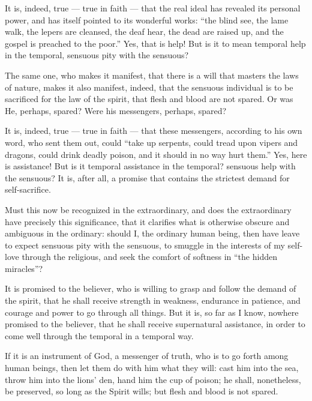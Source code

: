 \documentclass[12pt,a4paper]{book}
\begin{document}
It is, indeed, true --- true in faith --- that the real ideal has revealed its personal power, and has itself pointed to its wonderful works: ``the blind see, the lame walk, the lepers are cleansed, the deaf hear, the dead are raised up, and the gospel is preached to the poor.'' Yes, that is help! But is it to mean temporal help in the temporal, sensuous pity with the sensuous?

The same one, who makes it manifest, that there is a will that masters the laws of nature, makes it also manifest, indeed, that the sensuous individual is to be sacrificed for the law of the spirit, that flesh and blood are not spared. Or was He, perhaps, spared? Were his messengers, perhaps, spared?

It is, indeed, true --- true in faith --- that these messengers, according to his own word, who sent them out, could ``take up serpents, could tread upon vipers and dragons, could drink deadly poison, and it should in no way hurt them.''
Yes, here is assistance! But is it temporal assistance in the temporal? sensuous help with the sensuous? It is, after all, a promise that contains the strictest demand for self-sacrifice.

Must this now be recognized in the extraordinary, and does the extraordinary have precisely this significance, that it clarifies what is otherwise obscure and ambiguous in the ordinary: should I, the ordinary human being, then have leave to expect sensuous pity with the sensuous, to smuggle in the interests of my self-love through the religious, and seek the comfort of softness in ``the hidden miracles''?

It is promised to the believer, who is willing to grasp and follow the demand of the spirit, that he shall receive strength in weakness, endurance in patience, and courage and power to go through all things. But it is, so far as I know, nowhere promised to the believer, that he shall receive supernatural assistance, in order to come well through the temporal in a temporal way.

If it is an instrument of God, a messenger of truth, who is to go forth among human beings, then let them do with him what they will: cast him into the sea, throw him into the lions' den, hand him the cup of poison; he shall, nonetheless, be preserved, so long as the Spirit wills; but flesh and blood is not spared.
\end{document}

